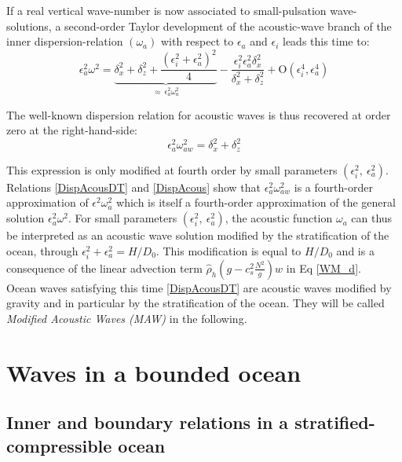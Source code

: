\documentclass[a4paper,11pt]{article}
\begin{document}
If a real vertical wave-number is now associated to small-pulsation wave-solutions, a second-order Taylor development of the acoustic-wave branch of the inner dispersion-relation $(\omega_a)$  with respect to $\epsilon_a$ and $\epsilon_i$ leads this time to:
\begin{equation}
		\epsilon_a^2\omega^2 =
		\underbrace{\delta_x^2+\delta_z^2
		+\frac{(\epsilon_i^2+\epsilon_a^2)^2}{4}}
		_{\approx\ \epsilon_a^2\omega_a^2}
		-\frac{\epsilon_i^2\epsilon_a^2\delta_x^2}{\delta_x^2+\delta_z^2}
		+\mathrm{O}(\epsilon_i^4,\epsilon_a^4)
		\label{DispAcousDT}
\end{equation}

The well-known dispersion relation for acoustic waves is thus recovered at order zero at the right-hand-side:
\begin{equation}
	\epsilon_a^2\omega_{aw}^2 =\delta_x^2+\delta_z^2
	\label{DispAcous}
\end{equation}

This expression is only modified at fourth order by small parameters $(\epsilon_i^2,\ \epsilon_a^2)$. Relations \ref{DispAcousDT} and \ref{DispAcous} show that $\epsilon_a^2 \omega_{aw}^2$ is a fourth-order approximation of $\epsilon^2 \omega_a^2$ which is itself a fourth-order approximation of the general solution $\epsilon_a^2 \omega^2$.
For small parameters $(\epsilon_i^2,\ \epsilon_a^2)$, the acoustic function $\omega_a$ can thus be interpreted as an acoustic wave solution modified by the stratification of the ocean, through $\epsilon_i^2+\epsilon_a^2=H/D_0$. This modification is equal to $H/D_0$ and is a consequence of the linear advection term $\hat{\rho}_h(g-c_s^2 \frac{N^2}{g})w$ in Eq \ref{WM_d}.\\
Ocean waves satisfying this time \ref{DispAcousDT} are acoustic waves modified by gravity and in particular by the stratification of the ocean. They will be called \textit{Modified Acoustic Waves (MAW)} in the following.

\newpage
\section{Waves in a bounded ocean}
\label{SectionGraphic}

\subsection{Inner and boundary relations in a stratified-compressible ocean}
\label{SubSectionPotBranches}
\end{document}

